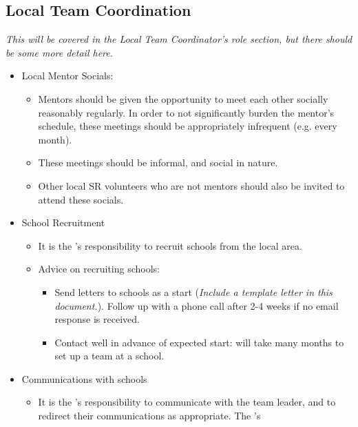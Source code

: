 \subsection{Local Team Coordination}

\textit{This will be covered in the Local Team Coordinator's role section, but there should be some more detail here.}

\begin{itemize}
\item Local Mentor Socials:
  \begin{itemize}
  \item Mentors should be given the opportunity to meet each other socially reasonably regularly.  In order to not significantly burden the mentor's schedule, these meetings should be appropriately infrequent (e.g. every month).
  \item These meetings should be informal, and social in nature.
  \item Other local SR volunteers who are not mentors should also be invited to attend these socials.
  \end{itemize}

\item School Recruitment
  \begin{itemize}
  \item It is the 's responsibility to recruit schools from the local area.
  \item Advice on recruiting schools:
    \begin{itemize}
    \item Send letters to schools as a start (\textit{Include a template letter in this document.}).  Follow up with a phone call after 2-4 weeks if no email response is received.
    \item Contact well in advance of expected start: will take many months to set up a team at a school.
    \end{itemize}
  \end{itemize}

\item Communications with schools
  \begin{itemize}
  \item It is the 's responsibility to communicate with the team leader, and to redirect their communications as appropriate.  The 's 
  \end{itemize}

\end{itemize}
